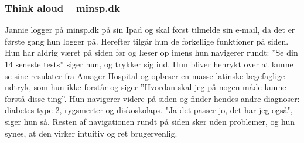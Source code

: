 \subsubsection*{Think aloud – minsp.dk}
Jannie logger på minsp.dk på sin Ipad og skal først tilmelde sin e-mail, da det er første gang hun logger på. Herefter tilgår hun de forkellige funktioner på siden. Hun har aldrig været på siden før og  læser op imens hun navigerer rundt: ”Se din 14 seneste tests” siger hun, og trykker sig ind. Hun bliver henrykt over at kunne se sine resulater fra Amager Hospital og oplæser en masse latinske lægefaglige udtryk, som hun ikke forstår og siger ”Hvordan skal jeg på nogen måde kunne forstå disse ting”. Hun navigerer videre på siden og finder hendes andre diagnoser: diabetes type-2, rygsmerter og diskoskolaps. "Ja det passer jo, det har jeg også", siger hun så. Resten af navigationen rundt på siden sker uden problemer, og hun synes, at den virker intuitiv og ret brugervenlig. 
